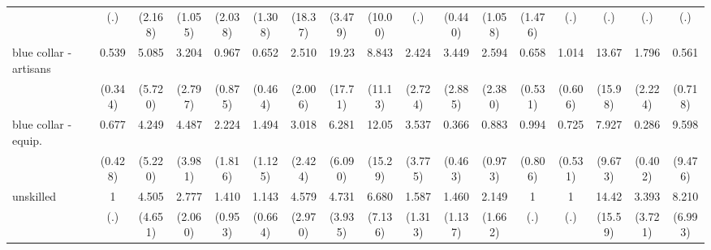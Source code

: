 {\begin{tabular}{l*{16}{c}}
                    &         (.)         &     (2.168)         &     (1.055)         &     (2.038)         &     (1.308)         &     (18.37)         &     (3.479)         &     (10.00)         &         (.)         &     (0.440)         &     (1.058)         &     (1.476)         &         (.)         &         (.)         &         (.)         &         (.)         \\
[1em]
blue collar - artisans&       0.539         &       5.085         &       3.204         &       0.967         &       0.652         &       2.510         &       19.23\sym{**} &       8.843         &       2.424         &       3.449         &       2.594         &       0.658         &       1.014         &       13.67\sym{*}  &       1.796         &       0.561         \\
                    &     (0.344)         &     (5.720)         &     (2.797)         &     (0.875)         &     (0.464)         &     (2.006)         &     (17.71)         &     (11.13)         &     (2.724)         &     (2.885)         &     (2.380)         &     (0.531)         &     (0.606)         &     (15.98)         &     (2.224)         &     (0.718)         \\
[1em]
blue collar - equip.&       0.677         &       4.249         &       4.487         &       2.224         &       1.494         &       3.018         &       6.281         &       12.05\sym{*}  &       3.537         &       0.366         &       0.883         &       0.994         &       0.725         &       7.927         &       0.286         &       9.598\sym{*}  \\
                    &     (0.428)         &     (5.220)         &     (3.981)         &     (1.816)         &     (1.125)         &     (2.424)         &     (6.090)         &     (15.29)         &     (3.775)         &     (0.463)         &     (0.973)         &     (0.806)         &     (0.531)         &     (9.673)         &     (0.402)         &     (9.476)         \\
[1em]
unskilled           &           1         &       4.505         &       2.777         &       1.410         &       1.143         &       4.579\sym{*}  &       4.731         &       6.680         &       1.587         &       1.460         &       2.149         &           1         &           1         &       14.42\sym{*}  &       3.393         &       8.210\sym{*}  \\
                    &         (.)         &     (4.651)         &     (2.060)         &     (0.953)         &     (0.664)         &     (2.970)         &     (3.935)         &     (7.136)         &     (1.313)         &     (1.137)         &     (1.662)         &         (.)         &         (.)         &     (15.59)         &     (3.721)         &     (6.993)         \\

\end{tabular}}
